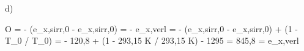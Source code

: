 d)

O = - (e_x,sirr,0 - e_x,sirr,0) = - e_x,verl = - (e_x,sirr,0 - e_x,sirr,0) + (1 - T_0 / T_0) = - 120,8  + (1 - 293,15 K / 293,15 K) - 1295  = 845,8  = e_x,verl